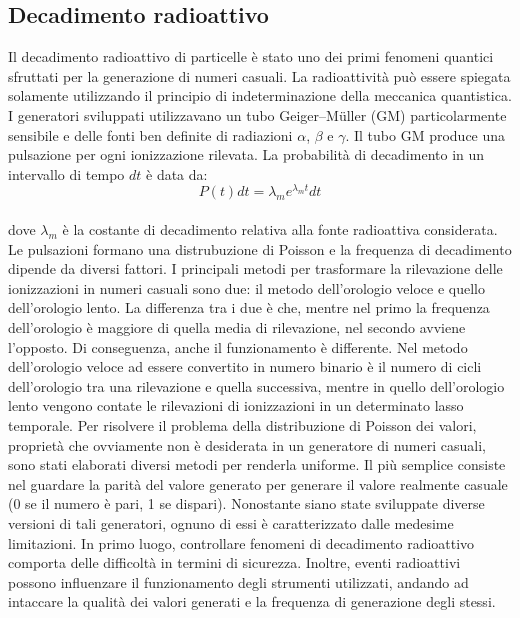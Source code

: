 \subsection{Decadimento radioattivo} \label{sssec:decadimento_radioattivo}
Il decadimento radioattivo di particelle è stato uno dei primi fenomeni quantici sfruttati per la generazione di numeri casuali. La radioattività può essere spiegata solamente utilizzando il principio di indeterminazione della meccanica quantistica. I generatori sviluppati utilizzavano un tubo Geiger–Müller (GM) particolarmente sensibile e delle fonti ben definite di radiazioni $\alpha$, $\beta$ e $\gamma$. Il tubo GM produce una pulsazione per ogni ionizzazione rilevata. La probabilità di decadimento in un intervallo di tempo $dt$ è data da:
\\
\[ P(t)dt = \lambda_me^{\lambda_mt}dt \]
\\
dove $\lambda_m$ è la costante di decadimento relativa alla fonte radioattiva considerata. Le pulsazioni formano una distrubuzione di Poisson e la frequenza di decadimento dipende da diversi fattori. I principali metodi per trasformare la rilevazione delle ionizzazioni in numeri casuali sono due: il metodo dell'orologio veloce e quello dell'orologio lento. La differenza tra i due è che, mentre nel primo la frequenza dell'orologio è maggiore di quella media di rilevazione, nel secondo avviene l'opposto. Di conseguenza, anche il funzionamento è differente. Nel metodo dell'orologio veloce ad essere convertito in numero binario è il numero di cicli dell'orologio tra una rilevazione e quella successiva, mentre in quello dell'orologio lento vengono contate le rilevazioni di ionizzazioni in un determinato lasso temporale. Per risolvere il problema della distribuzione di Poisson dei valori, proprietà che ovviamente non è desiderata in un generatore di numeri casuali, sono stati elaborati diversi metodi per renderla uniforme. Il più semplice consiste nel guardare la parità del valore generato per generare il valore realmente casuale (0 se il numero è pari, 1 se dispari). Nonostante siano state sviluppate diverse versioni di tali generatori, ognuno di essi è caratterizzato dalle medesime limitazioni. In primo luogo, controllare fenomeni di decadimento radioattivo comporta delle difficoltà in termini di sicurezza. Inoltre, eventi radioattivi possono influenzare il funzionamento degli strumenti utilizzati, andando ad intaccare la qualità dei valori generati e la frequenza di generazione degli stessi.

